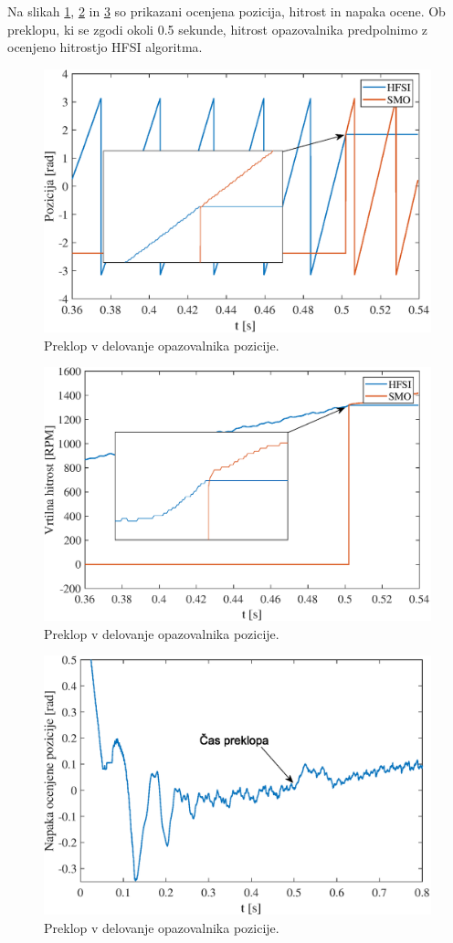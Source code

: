 \documentclass[a4paper,twoside,openright,12pt,slovene]{book}
\begin{document}
Na slikah \ref{brezudarniPreklop_Pos}, \ref{brezudarniPreklop_Speed} in \ref{brezudarniPreklop_Err} so prikazani ocenjena pozicija, hitrost in napaka ocene. Ob preklopu, ki se zgodi okoli 0.5 sekunde,
hitrost opazovalnika predpolnimo z ocenjeno hitrostjo HFSI algoritma.

\begin{figure}[!htbp]
    \centering
    \includegraphics[width=0.8\columnwidth]{Slike/brezudarniPreklop_Pos.eps}
    \caption{\label{brezudarniPreklop_Pos} Preklop v delovanje opazovalnika pozicije. }
\end{figure}

\begin{figure}[!htbp]
    \centering
    \includegraphics[width=0.8\columnwidth]{Slike/brezudarniPreklop_Speed.eps}
    \caption{\label{brezudarniPreklop_Speed} Preklop v delovanje opazovalnika pozicije. }
\end{figure}

\begin{figure}[!htbp]
    \centering
    \includegraphics[width=0.8\columnwidth]{Slike/brezudarniPreklop_Err.eps}
    \caption{\label{brezudarniPreklop_Err} Preklop v delovanje opazovalnika pozicije. }
\end{figure}
\end{document}
